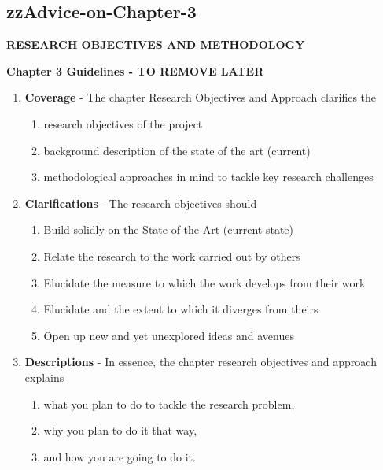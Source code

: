 \pagebreak
\begin{tcolorbox}
	
\section{zzAdvice-on-Chapter-3}

\textbf{RESEARCH OBJECTIVES AND METHODOLOGY}
\vspace*{1\baselineskip}

\textbf{Chapter 3 Guidelines - TO REMOVE LATER}	
\vspace*{1\baselineskip}
	
	\begin{enumerate}
		\item \textbf{Coverage} - The chapter Research Objectives and Approach clarifies the 
		\begin{enumerate}
			\item research objectives of the project
			\item background description of the state of the art (current)
			\item methodological approaches in mind to tackle key research challenges
		\end{enumerate}
		
		\item \textbf{Clarifications} - The research objectives should
		\begin{enumerate}
			\item Build solidly on the State of the Art (current state) 
			\item Relate the research to the work carried out by others 
			\item Elucidate the measure to which the work develops from their work 
			\item Elucidate and the extent to which it diverges from theirs 
			\item Open up new and yet unexplored ideas and avenues 
			
		\end{enumerate}
		
		\item \textbf{Descriptions} - In essence, the chapter research objectives and approach explains
		\begin{enumerate}
			\item what you plan to do to tackle the research problem, 
			\item why you plan to do it that way, 
			\item and how you are going to do it.
		\end{enumerate}
		

\end{enumerate}
\end{tcolorbox}
